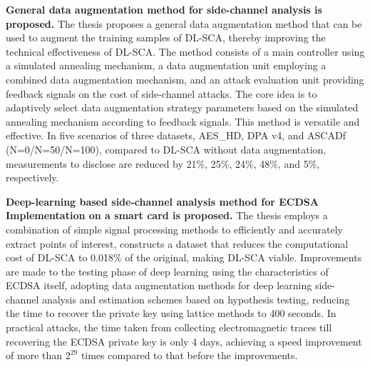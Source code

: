 \textbf{General data augmentation method for side-channel analysis is proposed.} The thesis proposes a general data augmentation method that can be used to augment the training samples of DL-SCA, thereby improving the technical effectiveness of DL-SCA. The method consists of a main controller using a simulated annealing mechanism, a data augmentation unit employing a combined data augmentation mechanism, and an attack evaluation unit providing feedback signals on the cost of side-channel attacks. The core idea is to adaptively select data augmentation strategy parameters based on the simulated annealing mechanism according to feedback signals. This method is versatile and effective. In five scenarios of three datasets, AES\_HD, DPA v4, and ASCADf (N=0/N=50/N=100), compared to DL-SCA without data augmentation, measurements to disclose are reduced by 21\%, 25\%, 24\%, 48\%, and 5\%, respectively.

\textbf{Deep-learning based side-channel analysis method for ECDSA Implementation on a smart card is proposed.} The thesis employs a combination of simple signal processing methods to efficiently and accurately extract points of interest, constructs a dataset that reduces the computational cost of DL-SCA to 0.018\% of the original, making DL-SCA viable. Improvements are made to the testing phase of deep learning using the characteristics of ECDSA itself, adopting data augmentation methods for deep learning side-channel analysis and estimation schemes based on hypothesis testing, reducing the time to recover the private key using lattice methods to 400 seconds. In practical attacks, the time taken from collecting electromagnetic traces till recovering the ECDSA private key is only 4 days, achieving a speed improvement of more than $2^{29}$ times compared to that before the improvements.


\pagestyle{enfrontmatterstyle}%
\cleardoublepage\pagestyle{frontmatterstyle}%

